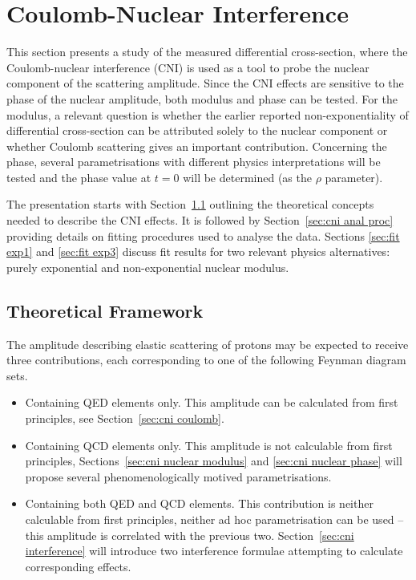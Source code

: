 \section{Coulomb-Nuclear Interference}
\label{sec:coulomb}

This section presents a study of the measured differential cross-section, where the Coulomb-nuclear interference (CNI) is used as a tool to probe the nuclear component of the scattering amplitude. Since the CNI effects are sensitive to the phase of the nuclear amplitude, both modulus and phase can be tested. For the modulus, a relevant question is whether the earlier reported non-exponentiality of differential cross-section \cite{8tev-90m} can be attributed solely to the nuclear component or whether Coulomb scattering gives an important contribution. Concerning the phase, several parametrisations with different physics interpretations will be tested and the phase value at $t = 0$ will be determined (as the $\rho$ parameter).

The presentation starts with Section~\ref{sec:cni framework} outlining the theoretical concepts needed to describe the CNI effects. It is followed by Section~\ref{sec:cni anal proc} providing details on fitting procedures used to analyse the data. Sections \ref{sec:fit exp1} and \ref{sec:fit exp3} discuss fit results for two relevant physics alternatives: purely exponential and non-exponential nuclear modulus.




\subsection{Theoretical Framework}
\label{sec:cni framework}

The amplitude describing elastic scattering of protons may be expected to receive three contributions, each corresponding to one of the following Feynman diagram sets.
\begin{itemize}
\item Containing QED elements only. This amplitude can be calculated from first principles, see Section~\ref{sec:cni coulomb}.
\item Containing QCD elements only. This amplitude is not calculable from first principles, Sections~\ref{sec:cni nuclear modulus} and \ref{sec:cni nuclear phase} will propose several phenomenologically motived parametrisations.
\item Containing both QED and QCD elements. This contribution is neither calculable from first principles, neither ad hoc parametrisation can be used -- this amplitude is correlated with the previous two. Section~\ref{sec:cni interference} will introduce two interference formulae attempting to calculate corresponding effects.
\end{itemize}


